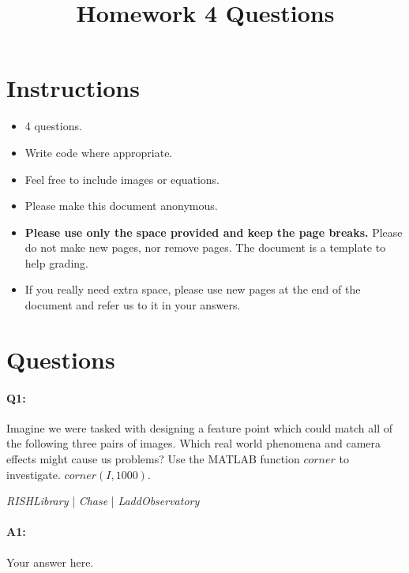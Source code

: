 \date{}

\title{\vspace{-1cm}Homework 4 Questions}



\maketitle
\vspace{-3cm}
\thispagestyle{fancy}

\section*{Instructions}
\begin{itemize}
  \item 4 questions.
  \item Write code where appropriate.
  \item Feel free to include images or equations.
  \item Please make this document anonymous.
  \item \textbf{Please use only the space provided and keep the page breaks.} Please do not make new pages, nor remove pages. The document is a template to help grading.
  \item If you really need extra space, please use new pages at the end of the document and refer us to it in your answers.
\end{itemize}

\section*{Questions}

\paragraph{Q1:} Imagine we were tasked with designing a feature point which could match all of the following three pairs of images. Which real world phenomena and camera effects might cause us problems?
Use the MATLAB function \href{https://www.mathworks.com/help/images/ref/corner.html}{$corner$} to investigate. $corner(I,1000)$.

\emph{RISHLibrary} | \emph{Chase} | \emph{LaddObservatory}

\paragraph{A1:} Your answer here.



